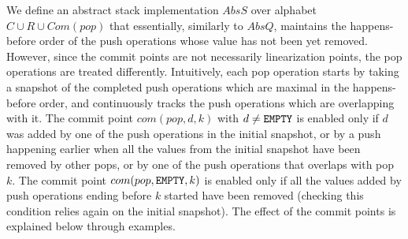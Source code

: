 We define an abstract stack implementation $AbsS$ over alphabet $C\cup R\cup Com(pop)$ that essentially, similarly to $AbsQ$, maintains the happens-before order of the push operations whose value has not been yet removed. However, since the commit points are not necessarily linearization points, the pop operations are treated differently. Intuitively, each pop operation starts by taking a snapshot of the completed push operations which are maximal in the happens-before order, and continuously tracks the push operations which are overlapping with it. The commit point $com(pop,d,k)$ with $d\neq {\tt EMPTY}$ is enabled only if $d$ was added by one of the push operations in the initial snapshot, or by a push happening earlier when all the values from the initial snapshot have been removed by other pops, or by one of the push operations that overlaps with pop $k$. The commit point $com(pop,{\tt EMPTY},k)$ is enabled only if all the values added by push operations ending before $k$ started have been removed (checking this condition relies again on the initial snapshot). The effect of the commit points is explained below through examples.

